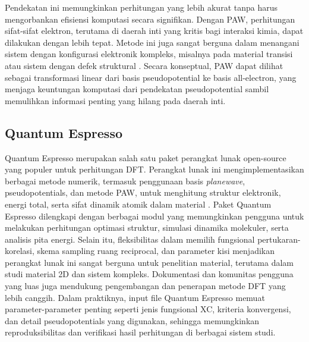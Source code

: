 Pendekatan ini memungkinkan perhitungan yang lebih akurat tanpa harus mengorbankan efisiensi komputasi secara signifikan. Dengan PAW, perhitungan sifat-sifat elektron, terutama di daerah inti yang kritis bagi interaksi kimia, dapat dilakukan dengan lebih tepat. Metode ini juga sangat berguna dalam menangani sistem dengan konfigurasi elektronik kompleks, misalnya pada material transisi atau sistem dengan defek struktural \citep{Blochl1994}. Secara konseptual, PAW dapat dilihat sebagai transformasi linear dari basis pseudopotential ke basis all-electron, yang menjaga keuntungan komputasi dari pendekatan pseudopotential sambil memulihkan informasi penting yang hilang pada daerah inti. \subsection{Quantum Espresso}
Quantum Espresso merupakan salah satu paket perangkat lunak open-source yang populer untuk perhitungan DFT. Perangkat lunak ini mengimplementasikan berbagai metode numerik, termasuk penggunaan basis \emph{planewave}, pseudopotentials, dan metode PAW, untuk menghitung struktur elektronik, energi total, serta sifat dinamik atomik dalam material \citep{Giannozzi2009}. Paket Quantum Espresso dilengkapi dengan berbagai modul yang memungkinkan pengguna untuk melakukan perhitungan optimasi struktur, simulasi dinamika molekuler, serta analisis pita energi. Selain itu, fleksibilitas dalam memilih fungsional pertukaran-korelasi, skema sampling ruang reciprocal, dan parameter kisi menjadikan perangkat lunak ini sangat berguna untuk penelitian material, terutama dalam studi material 2D dan sistem kompleks. Dokumentasi dan komunitas pengguna yang luas juga mendukung pengembangan dan penerapan metode DFT yang lebih canggih. Dalam praktiknya, input file Quantum Espresso memuat parameter-parameter penting seperti jenis fungsional XC, kriteria konvergensi, dan detail pseudopotentials yang digunakan, sehingga memungkinkan reproduksibilitas dan verifikasi hasil perhitungan di berbagai sistem studi. %
